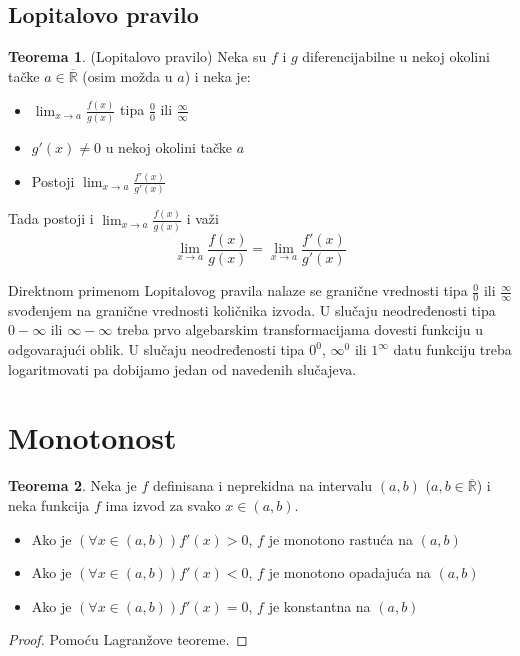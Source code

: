 \documentclass{article}
\theoremstyle{definition}
\newtheorem{theorem}{Teorema}[section]
\begin{document}
        \subsection{Lopitalovo pravilo}
            \begin{theorem}
                (Lopitalovo pravilo) Neka su $f$ i $g$ diferencijabilne u nekoj okolini tačke $a \in \overline{\mathbb{R}}$ (osim možda u $a$) i neka je:
                \begin{itemize}
                    \item $\lim_{x \to a} \frac{f(x)}{g(x)}$ tipa $\frac{0}{0}$ ili $\frac{\infty}{\infty}$
                    \item $g'(x) \neq 0$ u nekoj okolini tačke $a$
                    \item Postoji $\lim_{x \to a} \frac{f'(x)}{g'(x)}$
                \end{itemize}
                Tada postoji i $\lim_{x \to a} \frac{f(x)}{g(x)}$ i važi
                $$\lim_{x \to a} \frac{f(x)}{g(x)} = \lim_{x \to a} \frac{f'(x)}{g'(x)}$$
            \end{theorem}
            
            Direktnom primenom Lopitalovog pravila nalaze se granične vrednosti tipa $\frac{0}{0}$ ili $\frac{\infty}{\infty}$ svođenjem na granične vrednosti količnika izvoda. U slučaju neodređenosti tipa $0 - \infty$ ili $\infty - \infty$ treba prvo algebarskim transformacijama dovesti funkciju u odgovarajući oblik. U slučaju neodređenosti tipa $0^0$, $\infty^0$ ili $1^{\infty}$ datu funkciju treba logaritmovati pa dobijamo jedan od navedenih slučajeva.
    
    \section{Monotonost}
        \begin{theorem}
            Neka je $f$ definisana i neprekidna na intervalu $(a, b)$ ($a, b \in \overline{\mathbb{R}}$) i neka funkcija $f$ ima izvod za svako $x \in (a, b)$.
            \begin{itemize}
                \item Ako je $(\forall x \in (a, b)) f'(x) > 0$, $f$ je monotono rastuća na $(a, b)$
                \item Ako je $(\forall x \in (a, b)) f'(x) < 0$, $f$ je monotono opadajuća na $(a, b)$
                \item Ako je $(\forall x \in (a, b)) f'(x) = 0$, $f$ je konstantna na $(a, b)$
            \end{itemize}
        \end{theorem}
        \begin{proof}
            Pomoću Lagranžove teoreme.
        \end{proof}
\end{document}
